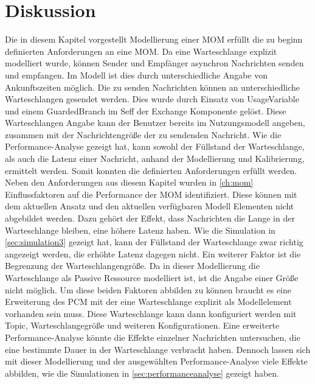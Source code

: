 \section{Diskussion}
Die in diesem Kapitel vorgestellt Modellierung einer MOM erfüllt die zu beginn definierten Anforderungen an eine MOM. Da eine Warteschlange explizit modelliert wurde, können Sender und Empfänger asynchron Nachrichten senden und empfangen. Im Modell ist dies durch unterschiedliche Angabe von Ankunftszeiten möglich. Die zu senden Nachrichten können an unterschiedliche Warteschlangen gesendet werden. Dies wurde durch Einsatz von UsageVariable und einem GuardedBranch im Seff der Exchange Komponente gelöst. Diese Warteschlangen Angabe kann der Benutzer bereits im Nutzungsmodell angeben, zusammen mit der Nachrichtengröße der zu sendenden Nachricht. Wie die Performance-Analyse gezeigt hat, kann sowohl der Füllstand der Warteschlange, als auch die Latenz einer Nachricht, anhand der Modellierung und Kalibrierung, ermittelt werden. Somit konnten die definierten Anforderungen erfüllt werden. Neben den Anforderungen aus diesem Kapitel wurden in \autoref{ch:mom} Einflussfaktoren auf die Performance der MOM identifiziert. Diese können mit dem aktuellen Ansatz und den aktuellen verfügbaren Modell Elementen nicht abgebildet werden. Dazu gehört der Effekt, dass Nachrichten die Lange in der Warteschlange bleiben, eine höhere Latenz haben. Wie die Simulation in \autoref{sec:simulation3} gezeigt hat, kann der Füllstand der Warteschlange zwar richtig angezeigt werden, die erhöhte Latenz dagegen nicht. Ein weiterer Faktor ist die Begrenzung der Warteschlangengröße. Da in dieser Modellierung die Warteschlange als Passive Ressource modelliert ist, ist die Angabe einer Größe nicht möglich. Um diese beiden Faktoren abbilden zu können braucht es eine Erweiterung des PCM mit der eine Warteschlange explizit als Modellelement vorhanden sein muss. Diese Warteschlange kann dann konfiguriert werden mit Topic, Warteschlangegröße und weiteren Konfigurationen. Eine erweiterte Performance-Analyse könnte die Effekte einzelner Nachrichten untersuchen, die eine bestimmte Dauer in der Warteschlange verbracht haben. Dennoch lassen sich mit dieser Modellierung und der ausgewählten Performance-Analyse viele Effekte abbilden, wie die Simulationen in \autoref{sec:performanceanalyse} gezeigt haben.

